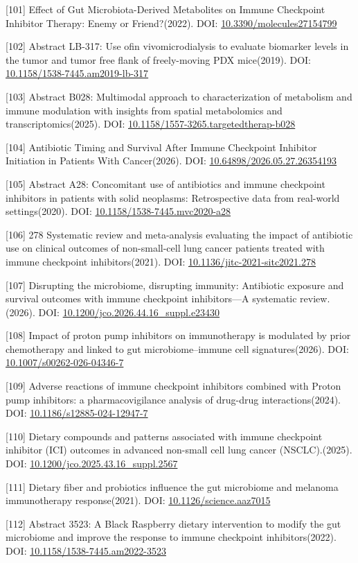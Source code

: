 {[}101{]} Effect of Gut Microbiota-Derived Metabolites on Immune Checkpoint Inhibitor Therapy: Enemy or Friend?(2022). DOI: \url{10.3390/molecules27154799}

{[}102{]} Abstract LB-317: Use ofin vivomicrodialysis to evaluate biomarker levels in the tumor and tumor free flank of freely-moving PDX mice(2019). DOI: \url{10.1158/1538-7445.am2019-lb-317}

{[}103{]} Abstract B028: Multimodal approach to characterization of metabolism and immune modulation with insights from spatial metabolomics and transcriptomics(2025). DOI: \url{10.1158/1557-3265.targetedtherap-b028}

{[}104{]} Antibiotic Timing and Survival After Immune Checkpoint Inhibitor Initiation in Patients With Cancer(2026). DOI: \url{10.64898/2026.05.27.26354193}

{[}105{]} Abstract A28: Concomitant use of antibiotics and immune checkpoint inhibitors in patients with solid neoplasms: Retrospective data from real-world settings(2020). DOI: \url{10.1158/1538-7445.mvc2020-a28}

{[}106{]} 278 Systematic review and meta-analysis evaluating the impact of antibiotic use on clinical outcomes of non-small-cell lung cancer patients treated with immune checkpoint inhibitors(2021). DOI: \url{10.1136/jitc-2021-sitc2021.278}

{[}107{]} Disrupting the microbiome, disrupting immunity: Antibiotic exposure and survival outcomes with immune checkpoint inhibitors---A systematic review.(2026). DOI: \url{10.1200/jco.2026.44.16_suppl.e23430}

{[}108{]} Impact of proton pump inhibitors on immunotherapy is modulated by prior chemotherapy and linked to gut microbiome--immune cell signatures(2026). DOI: \url{10.1007/s00262-026-04346-7}

{[}109{]} Adverse reactions of immune checkpoint inhibitors combined with Proton pump inhibitors: a pharmacovigilance analysis of drug-drug interactions(2024). DOI: \url{10.1186/s12885-024-12947-7}

{[}110{]} Dietary compounds and patterns associated with immune checkpoint inhibitor (ICI) outcomes in advanced non-small cell lung cancer (NSCLC).(2025). DOI: \url{10.1200/jco.2025.43.16_suppl.2567}

{[}111{]} Dietary fiber and probiotics influence the gut microbiome and melanoma immunotherapy response(2021). DOI: \url{10.1126/science.aaz7015}

{[}112{]} Abstract 3523: A Black Raspberry dietary intervention to modify the gut microbiome and improve the response to immune checkpoint inhibitors(2022). DOI: \url{10.1158/1538-7445.am2022-3523}

